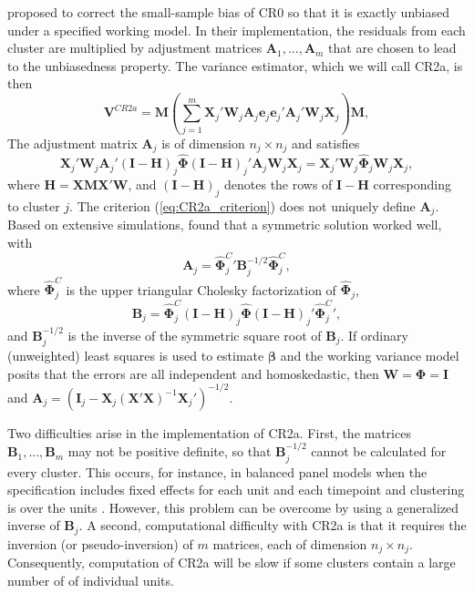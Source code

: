 \documentclass[12pt]{article}\usepackage[]{graphicx}\usepackage[]{color}
\newcommand{\bm}{\mathbf}
\newcommand{\bs}{\boldsymbol}
\begin{document}
\citet[see also \citealp{Bell2002bias}]{McCaffrey2001generalizations} proposed to correct the small-sample bias of CR0 so that it is exactly unbiased under a specified working model. 
In their implementation, the residuals from each cluster are multiplied by adjustment matrices $\bm{A}_1,...,\bm{A}_m$ that are chosen to lead to the unbiasedness property. 
The variance estimator, which we will call CR2a, is then 
\begin{equation}
\label{eq:V_CR2a}
\bm{V}^{CR2a} = \bm{M}\left(\sum_{j=1}^m \bm{X}_j'\bm{W}_j \bm{A}_j \bm{e}_j \bm{e}_j' \bm{A}_j' \bm{W}_j \bm{X}_j\right) \bm{M},
\end{equation}
The adjustment matrix $\bm{A}_j$ is of dimension $n_j \times n_j$ and satisfies
\begin{equation}
\label{eq:CR2a_criterion}
\bm{X}_j' \bm{W}_j \bm{A}_j' \left(\bm{I} - \bm{H}\right)_j \hat{\bs\Phi} \left(\bm{I} - \bm{H}\right)_j' \bm{A}_j \bm{W}_j \bm{X}_j = \bm{X}_j' \bm{W}_j \hat{\bs\Phi}_j \bm{W}_j \bm{X}_j,
\end{equation}
where $\bm{H} = \bm{X}\bm{M}\bm{X}'\bm{W}$, and $\left(\bm{I} - \bm{H}\right)_j$ denotes the rows of $\bm{I} - \bm{H}$ corresponding to cluster $j$. 
The criterion (\ref{eq:CR2a_criterion}) does not uniquely define $\bm{A}_j$. 
Based on extensive simulations, \citet{McCaffrey2001generalizations} found that a symmetric solution worked well, with 
\begin{equation}
\label{eq:CR2a_adjustment}
\bm{A}_j = {\bs{\hat\Phi}_j^C}' \bm{B}_j^{-1/2}\hat{\bs\Phi}_j^C,
\end{equation}
where $\hat{\bs\Phi}_j^C$ is the upper triangular Cholesky factorization of $\hat{\bs\Phi}_j$, 
\begin{equation}
\label{eq:CR2a_Bmatrix}
\bm{B}_j = \hat{\bs\Phi}_j^C\left(\bm{I} - \bm{H}\right)_j \hat{\bs\Phi} \left(\bm{I} - \bm{H}\right)_j' {\bs{\hat\Phi}_j^C}',
\end{equation}
and $\bm{B}_j^{-1/2}$ is the inverse of the symmetric square root of $\bm{B}_j $. 
If ordinary (unweighted) least squares is used to estimate $\bs\beta$ and the working variance model posits that the errors are all independent and homoskedastic, then $\bm{W} = \bs\Phi = \bm{I}$ and $\bm{A}_j = \left(\bm{I}_j - \bm{X}_j\left(\bm{X}'\bm{X}\right)^{-1}\bm{X}_j'\right)^{-1/2}$.

Two difficulties arise in the implementation of CR2a.
First, the matrices $\bm{B}_1,...,\bm{B}_m$ may not be positive definite, so that $\bm{B}_j^{-1/2}$ cannot be calculated for every cluster. 
This occurs, for instance, in balanced panel models when the specification includes fixed effects for each unit and each timepoint and clustering is over the units \citep[p. 320]{Angrist2009mostly}. 
However, this problem can be overcome by using a generalized inverse of $\bm{B}_j$. 
A second, computational difficulty with CR2a is that it requires the inversion (or pseudo-inversion) of $m$ matrices, each of dimension $n_j \times n_j$. 
Consequently, computation of CR2a will be slow if some clusters contain a large number of of individual units. 
\end{document}
